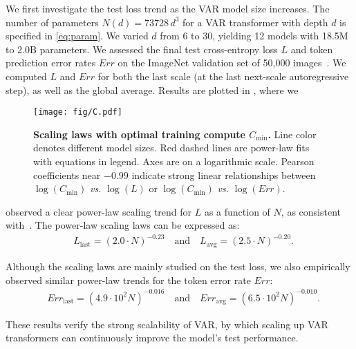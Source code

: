 \vspace{4pt}
We first investigate the test loss trend as the VAR model size increases.
The number of parameters $N(d)=73728\,d^3$ for a VAR transformer with depth $d$ is specified in \eqref{eq:param}.
We varied $d$ from $6$ to $30$, yielding 12 models with 18.5M to 2.0B parameters. We assessed the final test cross-entropy loss $L$ and token prediction error rates $Err$ on the ImageNet validation set of 50,000 images~\cite{imagenet}.
We computed $L$ and $Err$ for both the last scale (at the last next-scale autoregressive step), as well as the global average.
Results are plotted in , where we

\vspace{-5pt}
\begin{figure}[th]
\begin{center}
\texttt{[image: fig/C.pdf]}
\end{center}
\vspace{-4pt}
\caption{\small
\textbf{Scaling laws with optimal training compute $C_\text{min}$.}
Line color denotes different model sizes.
Red dashed lines are power-law fits with equations in legend.
Axes are on a logarithmic scale.
Pearson coefficients near $-0.99$ indicate strong linear relationships between $\log(C_\text{min})$ \textit{vs.} $\log(L)$ or $\log(C_\text{min})$ \textit{vs.} $\log(Err)$.
}
\vspace{-4pt}
\label{fig:C}
\end{figure}

observed a clear power-law scaling trend for $L$ as a function of $N$, as consistent with~\cite{scalinglaw,scalingar,chinchilla,gpt4}. The power-law scaling laws can be expressed as:
\begin{align}
    &L_\text{last} = (2.0 \cdot N)^{-0.23} \quad \text{and} \quad L_\text{avg} = (2.5 \cdot N)^{-0.20}.
\end{align}

Although the scaling laws are mainly studied on the test loss, we also empirically observed similar power-law trends for the token error rate $Err$:\vspace{4pt}
\begin{align}
    &Err_\text{last} = (4.9 \cdot 10^2 N)^{-0.016} \quad \text{and} \quad Err_\text{avg} = (6.5 \cdot 10^2 N)^{-0.010}.
\end{align}\vspace{-12pt}

These results verify the strong scalability of VAR, by which scaling up VAR transformers can continuously improve the model's test performance.

